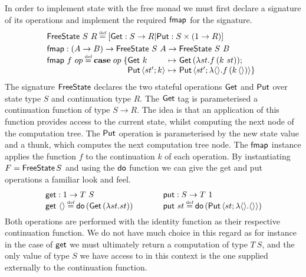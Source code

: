 \documentclass[12pt,phd,lfcs,twoside,openright,logo,leftchapter,normalheadings]{infthesis}
\theoremstyle{plain}
\theoremstyle{definition}
\begin{document}
%
In order to implement state with the free monad we must first declare
a signature of its operations and implement the required $\mathsf{fmap}$ for
the signature.
%
\[
  \bl
    \FreeState~S~R \defas [\Get:S \to R|\Put:S \times (\UnitType \to R)] \smallskip\\
    \fmap : (A \to B) \to \FreeState~S~A \to \FreeState~S~B\\
    \fmap~f~op \defas \Case\;op\;\{
    \ba[t]{@{}l@{~}c@{~}l}
       \Get~k    &\mapsto& \Get\,(\lambda st.f\,(k~st));\\
       \Put\,\Record{st';k} &\mapsto& \Put\,\Record{st';\lambda\Unit.f\,(k\,\Unit)}\}
    \ea
  \el
\]
%
The signature $\mathsf{FreeState}$ declares the two stateful operations $\mathsf{Get}$
and $\mathsf{Put}$ over state type $S$ and continuation type $R$. The $\mathsf{Get}$
tag is parameterised a continuation function of type $S \to R$. The
idea is that an application of this function provides access to the
current state, whilst computing the next node of the computation
tree. The $\mathsf{Put}$ operation is parameterised by the new state value and
a thunk, which computes the next computation tree node. The $\mathsf{fmap}$
instance applies the function $f$ to the continuation $k$ of each
operation.
%
By instantiating $F = \mathsf{FreeState}\,S$ and using the $\mathsf{do}$ function we
can give the get and put operations a familiar look and feel.
%
\[
  \ba{@{~}l@{\qquad\quad}@{~}r}
    \multirow{2}{*}{
      \bl
        \getF : \UnitType \to T~S\\
        \getF~\Unit \defas \DoF\,(\Get\,(\lambda st.st))
      \el} &
    \multirow{2}{*}{
      \bl
        \putF : S \to T~\UnitType\\
        \putF~st \defas \DoF\,(\Put\,\Record{st;\lambda\Unit.\Unit})
      \el} \\ & %
  \ea
\]
%
Both operations are performed with the identity function as their
respective continuation function. We do not have much choice in this
regard as for instance in the case of $\mathsf{get}$ we must ultimately
return a computation of type $T~S$, and the only value of type $S$ we
have access to in this context is the one supplied externally to the
continuation function.
\end{document}

